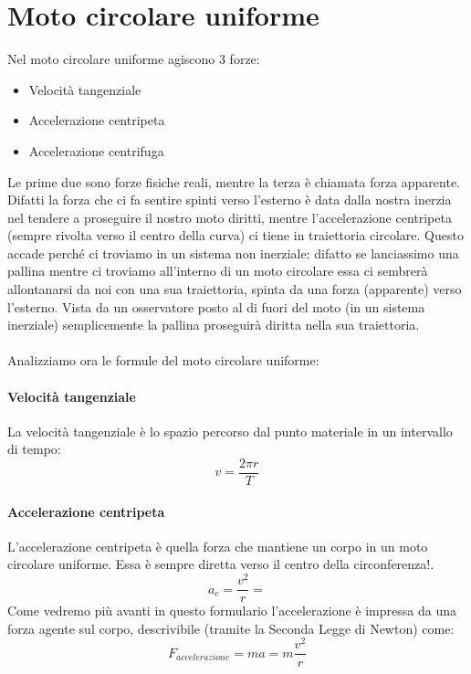     \section{Moto circolare uniforme}
        Nel moto circolare uniforme agiscono 3 forze:
        \begin{itemize}
            \item Velocità tangenziale
            \item Accelerazione centripeta
            \item Accelerazione centrifuga
        \end{itemize}
        Le prime due sono forze fisiche reali, mentre la terza è chiamata forza
        apparente. Difatti la forza che ci fa sentire spinti verso l'esterno è
        data dalla nostra inerzia nel tendere a proseguire il nostro moto 
        diritti, mentre l'accelerazione centripeta (sempre rivolta verso il
        centro della curva) ci tiene in traiettoria circolare. Questo accade
        perché ci troviamo in un sistema non inerziale: difatto se lanciassimo 
        una pallina mentre ci troviamo all'interno di un moto circolare essa ci
        sembrerà allontanarsi da noi con una sua traiettoria, spinta da una 
        forza (apparente) verso l'esterno. Vista da un osservatore posto al di
        fuori del moto (in un sistema inerziale) semplicemente la pallina 
        proseguirà diritta nella sua traiettoria.\\\\
        Analizziamo ora le formule del moto circolare uniforme:

        \paragraph{Velocità tangenziale} La velocità tangenziale è lo spazio 
        percorso dal punto materiale in un intervallo di tempo:
        \begin{equation}
            v = \frac{2\pi r}{T}
        \end{equation}

        \paragraph{Accelerazione centripeta} L'accelerazione centripeta è 
        quella forza che mantiene un corpo in un moto circolare uniforme. Essa
        è sempre diretta verso il centro della circonferenza!.
        \begin{equation}
            a_c = \frac{v^2}{r}=
        \end{equation}
        Come vedremo più avanti in questo formulario l'accelerazione è impressa
        da una forza agente sul corpo, descrivibile (tramite la Seconda Legge
        di Newton) come:
        \begin{equation}
            F_{accelerazione} = ma = m\frac{v^2}{r}
        \end{equation}

